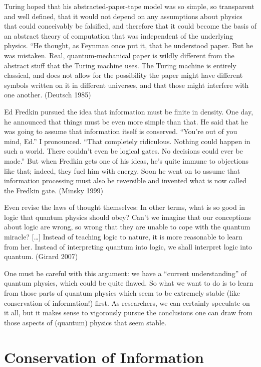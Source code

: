 \documentclass{article}
\begin{document}
Turing hoped that his abstracted-paper-tape model was so simple, so
transparent and well defined, that it would not depend on any
assumptions about physics that could conceivably be falsified, and
therefore that it could become the basis of an abstract theory of
computation that was independent of the underlying physics. ``He
thought, as Feynman once put it, that he understood paper. But he
was mistaken. Real, quantum-mechanical paper is wildly different from
the abstract stuff that the Turing machine uses. The Turing machine is
entirely classical, and does not allow for the possibility the paper
might have different symbols written on it in different universes, and
that those might interfere with one another.  (Deutsch 1985)

Ed Fredkin pursued the idea that information must be finite in
density. One day, he announced that things must be even more simple
than that. He said that he was going to assume that information itself
is conserved. ``You're out of you mind, Ed.'' I pronounced. ``That
completely ridiculous. Nothing could happen in such a world. There
couldn't even be logical gates. No decisions could ever be made.'' But
when Fredkin gets one of his ideas, he's quite immune to objections
like that; indeed, they fuel him with energy. Soon he went on to
assume that information processing must also be reversible and
invented what is now called the Fredkin gate. (Minsky 1999)

Even revise the laws of thought themselves: In other terms, what is so
good in logic that quantum physics should obey? Can't we imagine that
our conceptions about logic are wrong, so wrong that they are unable
to cope with the quantum miracle? [\ldots] Instead of teaching logic
to nature, it is more reasonable to learn from her. Instead of
interpreting quantum into logic, we shall interpret logic into
quantum. (Girard 2007)

One must be careful with this argument: we have a ``current
understanding'' of quantum physics, which could be quite flawed.  So
what we want to do is to learn from those parts of quantum physics
which seem to be extremely stable (like conservation of information!)
first. As researchers, we can certainly speculate on it all, but it
makes sense to vigorously pursue the conclusions one can draw from
those aspects of (quantum) physics that seem stable.

\section{Conservation of Information}
\end{document}
